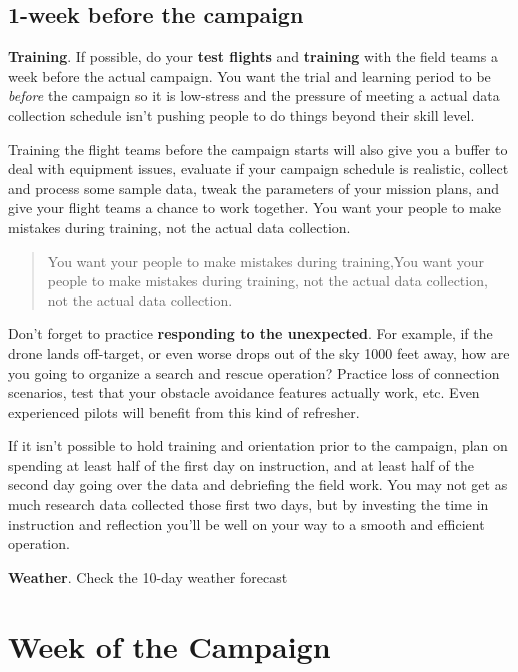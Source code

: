 \documentclass[
]{book}
\begin{document}
\hypertarget{week-before-the-campaign}{%
\subsection{1-week before the campaign}\label{week-before-the-campaign}}

\textbf{Training}. If possible, do your \textbf{test flights} and \textbf{training} with the field teams a week before the actual campaign. You want the trial and learning period to be \emph{before} the campaign so it is low-stress and the pressure of meeting a actual data collection schedule isn't pushing people to do things beyond their skill level.

Training the flight teams before the campaign starts will also give you a buffer to deal with equipment issues, evaluate if your campaign schedule is realistic, collect and process some sample data, tweak the parameters of your mission plans, and give your flight teams a chance to work together. You want your people to make mistakes during training, not the actual data collection.

\begin{quote}
You want your people to make mistakes during training,You want your people to make mistakes during training, not the actual data collection, not the actual data collection.
\end{quote}

Don't forget to practice \textbf{responding to the unexpected}. For example, if the drone lands off-target, or even worse drops out of the sky 1000 feet away, how are you going to organize a search and rescue operation? Practice loss of connection scenarios, test that your obstacle avoidance features actually work, etc. Even experienced pilots will benefit from this kind of refresher.

If it isn't possible to hold training and orientation prior to the campaign, plan on spending at least half of the first day on instruction, and at least half of the second day going over the data and debriefing the field work. You may not get as much research data collected those first two days, but by investing the time in instruction and reflection you'll be well on your way to a smooth and efficient operation.

\textbf{Weather}. Check the 10-day weather forecast

\hypertarget{week-of-the-campaign}{%
\section{Week of the Campaign}\label{week-of-the-campaign}}
\end{document}
